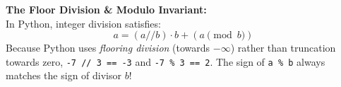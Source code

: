 \begin{memorytip}
\textbf{The Floor Division \& Modulo Invariant:}\\
In Python, integer division satisfies:
\begin{equation}
a = (a // b) \cdot b + (a \pmod b)
\end{equation}
Because Python uses \textit{flooring division} (towards $-\infty$) rather than truncation towards zero, \texttt{-7 // 3 == -3} and \texttt{-7 \% 3 == 2}. The sign of \texttt{a \% b} always matches the sign of divisor $b$!
\end{memorytip}
